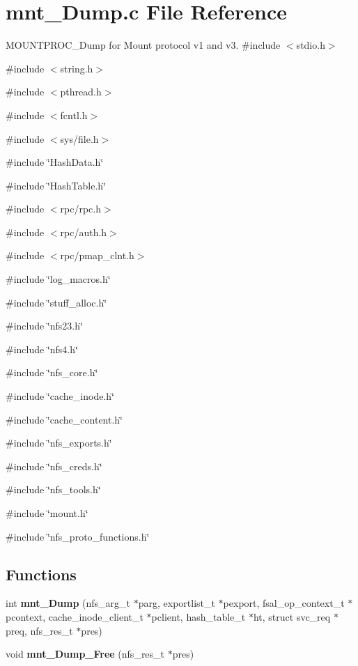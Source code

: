 \section{mnt\_\-Dump.c File Reference}
\label{mnt__Dump_8c}


MOUNTPROC\_\-Dump for Mount protocol v1 and v3.  
{\ttfamily \#include $<$stdio.h$>$}\par
{\ttfamily \#include $<$string.h$>$}\par
{\ttfamily \#include $<$pthread.h$>$}\par
{\ttfamily \#include $<$fcntl.h$>$}\par
{\ttfamily \#include $<$sys/file.h$>$}\par
{\ttfamily \#include \char`\"{}HashData.h\char`\"{}}\par
{\ttfamily \#include \char`\"{}HashTable.h\char`\"{}}\par
{\ttfamily \#include $<$rpc/rpc.h$>$}\par
{\ttfamily \#include $<$rpc/auth.h$>$}\par
{\ttfamily \#include $<$rpc/pmap\_\-clnt.h$>$}\par
{\ttfamily \#include \char`\"{}log\_\-macros.h\char`\"{}}\par
{\ttfamily \#include \char`\"{}stuff\_\-alloc.h\char`\"{}}\par
{\ttfamily \#include \char`\"{}nfs23.h\char`\"{}}\par
{\ttfamily \#include \char`\"{}nfs4.h\char`\"{}}\par
{\ttfamily \#include \char`\"{}nfs\_\-core.h\char`\"{}}\par
{\ttfamily \#include \char`\"{}cache\_\-inode.h\char`\"{}}\par
{\ttfamily \#include \char`\"{}cache\_\-content.h\char`\"{}}\par
{\ttfamily \#include \char`\"{}nfs\_\-exports.h\char`\"{}}\par
{\ttfamily \#include \char`\"{}nfs\_\-creds.h\char`\"{}}\par
{\ttfamily \#include \char`\"{}nfs\_\-tools.h\char`\"{}}\par
{\ttfamily \#include \char`\"{}mount.h\char`\"{}}\par
{\ttfamily \#include \char`\"{}nfs\_\-proto\_\-functions.h\char`\"{}}\par
\subsection*{Functions}
\begin{DoxyCompactItemize}
\item 
int {\bf mnt\_\-Dump} (nfs\_\-arg\_\-t $\ast$parg, exportlist\_\-t $\ast$pexport, fsal\_\-op\_\-context\_\-t $\ast$pcontext, cache\_\-inode\_\-client\_\-t $\ast$pclient, hash\_\-table\_\-t $\ast$ht, struct svc\_\-req $\ast$preq, nfs\_\-res\_\-t $\ast$pres)
\item 
void {\bf mnt\_\-Dump\_\-Free} (nfs\_\-res\_\-t $\ast$pres)
\end{DoxyCompactItemize}


